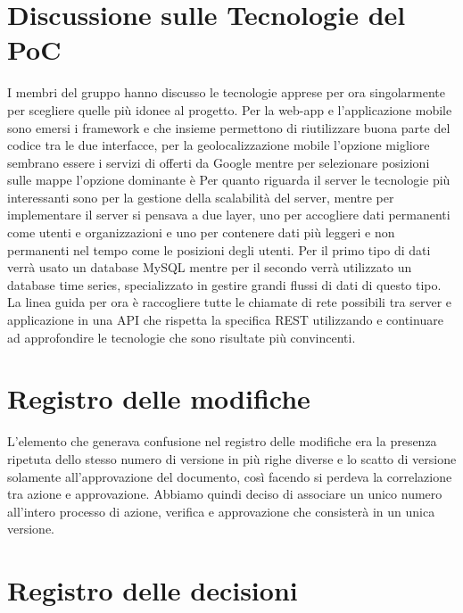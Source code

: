 \documentclass{article}
\begin{document}
\section{Discussione sulle Tecnologie del PoC}%
\label{sec:discussione_tecnologie_poc}
I membri del gruppo hanno discusso le tecnologie apprese per ora singolarmente per scegliere quelle più idonee al progetto.
Per la web-app e l'applicazione mobile sono emersi i framework  e  che insieme permettono di riutilizzare buona parte del codice tra le due interfacce, per la geolocalizzazione mobile l'opzione migliore sembrano essere i servizi di  offerti da Google mentre per selezionare posizioni sulle mappe l'opzione dominante è 
Per quanto riguarda il server le tecnologie più interessanti sono  per la gestione della scalabilità del server, mentre per implementare il server si pensava a due layer, uno per accogliere dati permanenti come utenti e organizzazioni e uno per contenere dati più leggeri e non permanenti nel tempo come le posizioni degli utenti.
Per il primo tipo di dati verrà usato un database MySQL mentre per il secondo verrà utilizzato un database time series, specializzato in gestire grandi flussi di dati di questo tipo.
La linea guida per ora è raccogliere tutte le chiamate di rete possibili tra server e applicazione in una API che rispetta la specifica REST utilizzando  e continuare ad approfondire le tecnologie che sono risultate più convincenti.

\section{Registro delle modifiche}%
\label{sec:registro_modifiche}
L'elemento che generava confusione nel registro delle modifiche era la presenza ripetuta dello stesso numero di versione in più righe diverse e lo scatto di versione solamente all'approvazione del documento, così facendo si perdeva la correlazione tra azione e approvazione.
Abbiamo quindi deciso di associare un unico numero all'intero processo di azione, verifica e approvazione che consisterà in un unica versione.

\newpage
\section{Registro delle decisioni}%
\label{sec:registro_delle_decisioni}
\end{document}
